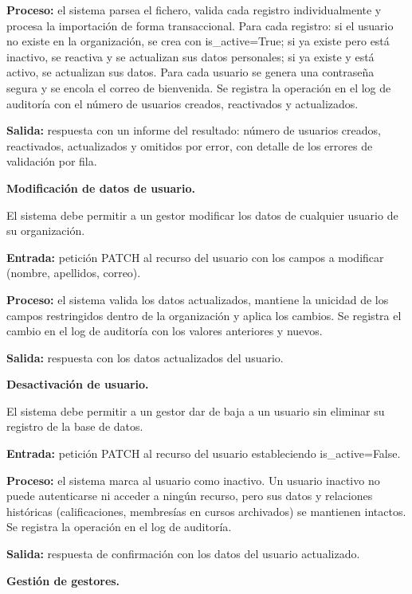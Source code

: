 \begin{functional}
\begin{functional}
    \textbf{Proceso:} el sistema parsea el fichero, valida cada registro individualmente y procesa la importación de forma transaccional. Para cada registro: si el usuario no existe en la organización, se crea con is\_active=True; si ya existe pero está inactivo, se reactiva y se actualizan sus datos personales; si ya existe y está activo, se actualizan sus datos. Para cada usuario se genera una contraseña segura y se encola el correo de bienvenida. Se registra la operación en el log de auditoría con el número de usuarios creados, reactivados y actualizados.

    \textbf{Salida:} respuesta con un informe del resultado: número de usuarios creados, reactivados, actualizados y omitidos por error, con detalle de los errores de validación por fila.

    \item \textbf{Modificación de datos de usuario.}

    El sistema debe permitir a un gestor modificar los datos de cualquier usuario de su organización.

    \textbf{Entrada:} petición PATCH al recurso del usuario con los campos a modificar (nombre, apellidos, correo).

    \textbf{Proceso:} el sistema valida los datos actualizados, mantiene la unicidad de los campos restringidos dentro de la organización y aplica los cambios. Se registra el cambio en el log de auditoría con los valores anteriores y nuevos.

    \textbf{Salida:} respuesta con los datos actualizados del usuario.

    \item \textbf{Desactivación de usuario.}

    El sistema debe permitir a un gestor dar de baja a un usuario sin eliminar su registro de la base de datos.

    \textbf{Entrada:} petición PATCH al recurso del usuario estableciendo is\_active=False.

    \textbf{Proceso:} el sistema marca al usuario como inactivo. Un usuario inactivo no puede autenticarse ni acceder a ningún recurso, pero sus datos y relaciones históricas (calificaciones, membresías en cursos archivados) se mantienen intactos. Se registra la operación en el log de auditoría.

    \textbf{Salida:} respuesta de confirmación con los datos del usuario actualizado.

    \item \textbf{Gestión de gestores.}


\end{functional}
\end{functional}
